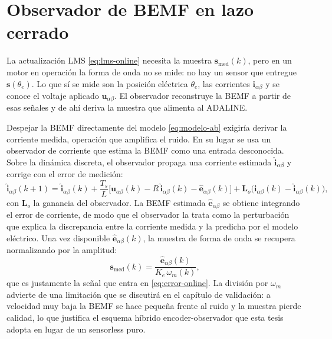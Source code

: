 \documentclass[../../../Tesis_JALS_Maestria.tex]{subfiles}
\begin{document}
\section{Observador de BEMF en lazo cerrado}
\label{sec:observador}

La actualización LMS \eqref{eq:lms-online} necesita la muestra $\mathbf{s}_\mathrm{med}(k)$, pero en un motor en operación la forma de onda no se mide: no hay un sensor que entregue $\mathbf{s}(\theta_e)$. Lo que sí se mide son la posición eléctrica $\theta_e$, las corrientes $\mathbf{i}_{\alpha\beta}$ y se conoce el voltaje aplicado $\mathbf{u}_{\alpha\beta}$. El observador reconstruye la BEMF a partir de esas señales y de ahí deriva la muestra que alimenta al ADALINE.

Despejar la BEMF directamente del modelo \eqref{eq:modelo-ab} exigiría derivar la corriente medida, operación que amplifica el ruido. En su lugar se usa un observador de corriente que estima la BEMF como una entrada desconocida. Sobre la dinámica discreta, el observador propaga una corriente estimada $\hat{\mathbf{i}}_{\alpha\beta}$ y corrige con el error de medición:
\begin{equation}
    \hat{\mathbf{i}}_{\alpha\beta}(k+1) = \hat{\mathbf{i}}_{\alpha\beta}(k) + \frac{T_s}{L}\bigl[\mathbf{u}_{\alpha\beta}(k) - R\,\hat{\mathbf{i}}_{\alpha\beta}(k) - \hat{\mathbf{e}}_{\alpha\beta}(k)\bigr] + \mathbf{L}_o\bigl(\mathbf{i}_{\alpha\beta}(k) - \hat{\mathbf{i}}_{\alpha\beta}(k)\bigr),
    \label{eq:observador-corriente}
\end{equation}
con $\mathbf{L}_o$ la ganancia del observador. La BEMF estimada $\hat{\mathbf{e}}_{\alpha\beta}$ se obtiene integrando el error de corriente, de modo que el observador la trata como la perturbación que explica la discrepancia entre la corriente medida y la predicha por el modelo eléctrico. Una vez disponible $\hat{\mathbf{e}}_{\alpha\beta}(k)$, la muestra de forma de onda se recupera normalizando por la amplitud:
\begin{equation}
    \mathbf{s}_\mathrm{med}(k) = \frac{\hat{\mathbf{e}}_{\alpha\beta}(k)}{K_e\,\omega_m(k)},
    \label{eq:smed}
\end{equation}
que es justamente la señal que entra en \eqref{eq:error-online}. La división por $\omega_m$ advierte de una limitación que se discutirá en el capítulo de validación: a velocidad muy baja la BEMF se hace pequeña frente al ruido y la muestra pierde calidad, lo que justifica el esquema híbrido encoder-observador que esta tesis adopta en lugar de un sensorless puro.
\end{document}
